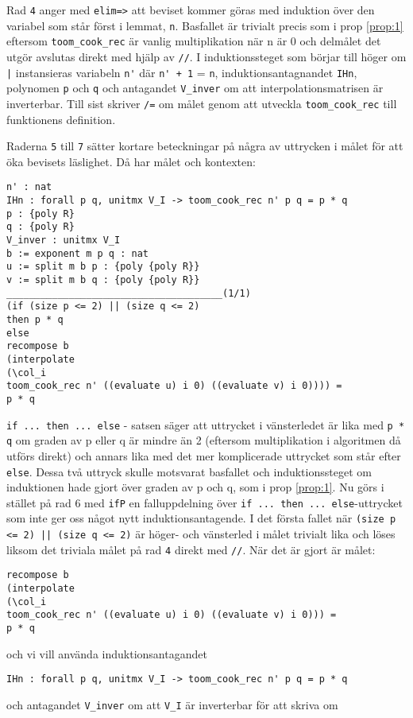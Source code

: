 Rad \verb+4+ anger med \verb+elim=>+ att beviset kommer göras med induktion
över den variabel som står först i lemmat, \verb=n=. Basfallet är trivialt
precis som i prop \ref{prop:1} eftersom \verb=toom_cook_rec= är vanlig
multiplikation när n är 0 och delmålet det utgör avslutas direkt med hjälp av
\verb=//=. I induktionssteget som börjar till höger om \verb+|+ instansieras
variabeln \verb=n'= där \verb=n' + 1=  = \verb=n=, induktionsantagnandet
\verb=IHn=, polynomen \verb=p= och \verb=q= och antagandet \verb=V_inver= om
att interpolationsmatrisen är inverterbar. Till sist skriver \verb+/=+ om målet
genom att utveckla \verb+toom_cook_rec+ till funktionens definition.

Raderna \verb+5+ till \verb+7+ sätter kortare beteckningar på några av
uttrycken i målet för att öka bevisets läslighet. Då har målet och kontexten:
\begin{verbatim}
n' : nat
IHn : forall p q, unitmx V_I -> toom_cook_rec n' p q = p * q
p : {poly R}
q : {poly R}
V_inver : unitmx V_I
b := exponent m p q : nat
u := split m b p : {poly {poly R}}
v := split m b q : {poly {poly R}}
______________________________________(1/1)
(if (size p <= 2) || (size q <= 2)
then p * q
else
recompose b
(interpolate
(\col_i
toom_cook_rec n' ((evaluate u) i 0) ((evaluate v) i 0)))) =
p * q
\end{verbatim}
\verb=if ... then ... else= - satsen säger att uttrycket i vänsterledet är lika
med \verb+p * q+ om graden av p eller q är mindre än 2 (eftersom multiplikation
i algoritmen då utförs direkt) och annars lika med det mer komplicerade
uttrycket som står efter \verb+else+. Dessa två uttryck skulle motsvarat
basfallet och induktionssteget om induktionen hade gjort över graden av p och
q, som i prop \ref{prop:1}. Nu görs i stället på rad 6 med \verb=ifP= en
falluppdelning över \verb=if ... then ... else=-uttrycket som inte ger oss
något nytt induktionsantagende. I det första fallet när
\verb+(size p <= 2) || (size q <= 2)+ är höger- och vänsterled i målet trivialt
lika och löses liksom det triviala målet på rad \verb+4+ direkt med \verb+//+.
När det är gjort är målet:
\begin{verbatim}
recompose b
(interpolate
(\col_i
toom_cook_rec n' ((evaluate u) i 0) ((evaluate v) i 0))) =
p * q
\end{verbatim}
och vi vill använda induktionsantagandet
\begin{verbatim}
IHn : forall p q, unitmx V_I -> toom_cook_rec n' p q = p * q
\end{verbatim}
och antagandet \verb+V_inver+ om att \verb+V_I+ är inverterbar för att skriva om
